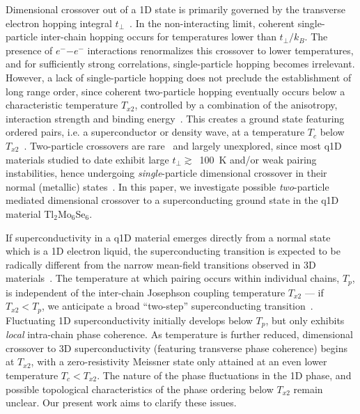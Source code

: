 \documentclass[prb,twocolumn,showpacs,preprintnumbers,amsmath,amssymb,floatfix,groupedaddress,superscriptaddress,aps,10pt]{revtex4-1}
\newcommand{\Tl}{Tl$_2$Mo$_6$Se$_6$}
\begin{document}
Dimensional crossover out of a 1D state is primarily governed by the transverse electron hopping integral $t_{\perp}$~\cite{Giamarchi2003}. In the non-interacting limit, coherent single-particle inter-chain hopping occurs for temperatures lower than $t_\perp/k_B$. The presence of $e^{-}$$-$$e^{-}$ interactions renormalizes this crossover to lower temperatures, and for sufficiently strong correlations, single-particle hopping becomes irrelevant. However, a lack of single-particle hopping does not preclude the establishment of long range order, since coherent two-particle hopping eventually occurs below a characteristic temperature $T_{x2}$, controlled by a combination of the anisotropy, interaction strength and binding energy~\cite{Brazovskii1985,Firsov1985,Bourbonnais1988,Boies1995}.  This creates a ground state featuring ordered pairs, i.e. a superconductor or density wave, at a temperature $T_c$ below $T_{x2}$~\cite{Bourbonnais1991}. Two-particle crossovers are rare~\cite{Wzietek1993,Klemme1995} and largely unexplored, since most q1D materials studied to date exhibit large $t_\perp\gtrsim$~100~K and/or weak pairing instabilities, hence undergoing \textit{single}-particle dimensional crossover in their normal (metallic) states~\cite{Hussey2002,Giamarchi2004,DosSantos2007}.  In this paper, we investigate possible \textit{two}-particle mediated dimensional crossover to a superconducting ground state in the q1D material {\Tl}.

If superconductivity in a q1D material emerges directly from a normal state which is a 1D electron liquid, the superconducting transition is expected to be radically different from the narrow mean-field transitions observed in 3D materials~\cite{Efetov1975}.  The temperature at which pairing occurs within individual chains, $T_p$, is independent of the inter-chain Josephson coupling temperature $T_{x2}$ --- if $T_{x2} < T_{p}$, we anticipate a broad ``two-step'' superconducting transition~\cite{Ansermet2016}.  Fluctuating 1D superconductivity initially develops below $T_p$, but only exhibits \emph{local} intra-chain phase coherence.  As temperature is further reduced, dimensional crossover to 3D superconductivity (featuring transverse phase coherence) begins at $T_{x2}$, with a zero-resistivity Meissner state only attained at an even lower temperature $T_c < T_{x2}$. The nature of the phase fluctuations in the 1D phase, and possible topological characteristics of the phase ordering below $T_{x2}$ remain unclear. Our present work aims to clarify these issues.  
\end{document}
